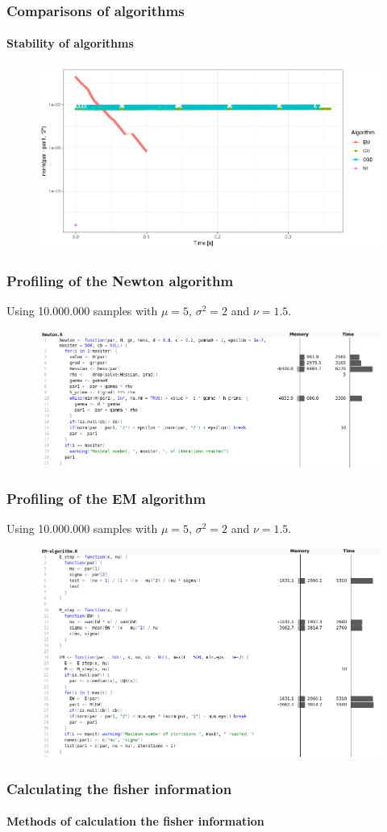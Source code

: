 \documentclass[aspectratio=169]{beamer}
\begin{document}
\begin{frame}
    \frametitle{Comparisons of algorithms}
    \framesubtitle{Stability of algorithms}
    \begin{figure}
        \centering
        \includegraphics[scale = 0.4]{pictures/NewComp/AllNormNu0_2.png}
    \end{figure}
\end{frame}
\begin{frame}
    \frametitle{Profiling of the Newton algorithm}
    Using 10.000.000 samples with $\mu = 5$, $\sigma^{2} = 2$ and $\nu = 1.5$.
    \begin{figure}
        \centering
        \includegraphics[scale = 0.4]{pictures/NewtonProfile.png}
    \end{figure}
\end{frame}
\begin{frame}
    \frametitle{Profiling of the EM algorithm}
    Using 10.000.000 samples with $\mu = 5$, $\sigma^{2} = 2$ and $\nu = 1.5$.
    \begin{figure}
        \centering
        \includegraphics[scale = 0.32]{pictures/EMProfile.png}
    \end{figure}
\end{frame}
\begin{frame}
    \frametitle{Calculating the fisher information}
    \framesubtitle{Methods of calculation the fisher information}

\end{frame}
\end{document}
